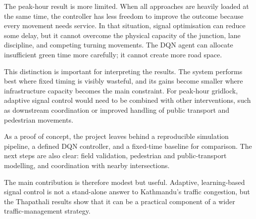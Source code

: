 The peak-hour result is more limited. When all approaches are heavily
loaded at the same time, the controller has less freedom to improve the
outcome because every movement needs service. In that situation, signal
optimisation can reduce some delay, but it cannot overcome the physical
capacity of the junction, lane discipline, and competing turning
movements. The DQN agent can allocate insufficient green time more
carefully; it cannot create more road space.

This distinction is important for interpreting the results. The system
performs best where fixed timing is visibly wasteful, and its gains
become smaller where infrastructure capacity becomes the main
constraint. For peak-hour gridlock, adaptive signal control would need
to be combined with other interventions, such as downstream coordination
or improved handling of public transport and pedestrian movements.

As a proof of concept, the project leaves behind a reproducible
simulation pipeline, a defined DQN controller, and a fixed-time baseline
for comparison. The next steps are also clear: field validation,
pedestrian and public-transport modelling, and coordination with nearby
intersections.

The main contribution is therefore modest but useful. Adaptive,
learning-based signal control is not a stand-alone answer to Kathmandu's
traffic congestion, but the Thapathali results show that it can be a
practical component of a wider traffic-management strategy.
